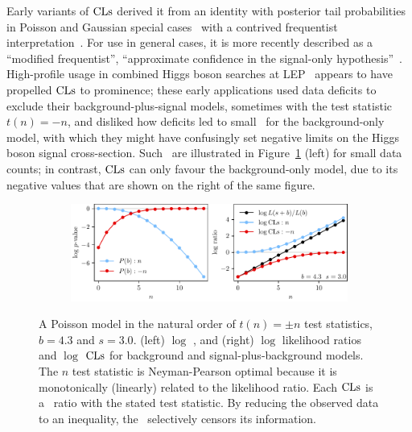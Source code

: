 Early variants of $\mathrm{CLs}$ derived it from an identity with posterior tail
probabilities in Poisson and Gaussian special cases~\cite{
Helene1983upper,
pdg1988,
read2000modified,
pdg2022ynf
}
with a contrived frequentist interpretation~\cite{zech1988cls}.
For use in general cases, it is more recently described as a
``modified frequentist'',
``approximate confidence in the signal-only hypothesis''~\cite{
read2000modified,
Read2002cls
}.
High-profile usage in combined Higgs boson searches at LEP~\cite{
read1997optimal,
bock1998lower,
etde1998prospects,
junk1999confidence,
lep2000searches,
lep2003search
}
appears to have propelled $\mathrm{CLs}$ to prominence;
these early applications used data deficits to exclude their
background-plus-signal models, sometimes with the test statistic $t(n) = -n$,
and disliked how deficits led to small \pvalues\ for the background-only model,
with which they might have confusingly set negative limits on the Higgs boson
signal cross-section.
Such \pvalues\ are illustrated in Figure~\ref{fig:searches_sb_n} (left)
for small data counts;
in contrast, $\mathrm{CLs}$ can only favour the background-only model, due to its
negative values that are shown on the right of the same figure.

\begin{figure}[tp]
\centering
\begin{subfigure}{\textwidth}
\centering
\includegraphics[width=\textwidth]{figures/searches_cls_plots_with_pvals_n.pdf}
\end{subfigure}
\caption[
A Poisson model in the natural order
]{%
A Poisson model in the natural order of $t(n) = \pm n$
test statistics, $b = 4.3$ and $s = 3.0$.
(left) $\log$ \pvalues,
and (right) $\log$ likelihood ratios and $\log$ $\mathrm{CLs}$ for
background and signal-plus-background models.
The $n$ test statistic is Neyman-Pearson optimal because it is monotonically
(linearly) related to the likelihood ratio.
Each $\mathrm{CLs}$ is a \pvalue\ ratio with the stated test statistic.
By reducing the observed data to an inequality, the \pvalue\ selectively
censors its information.
}
\label{fig:searches_sb_n}
\end{figure}

